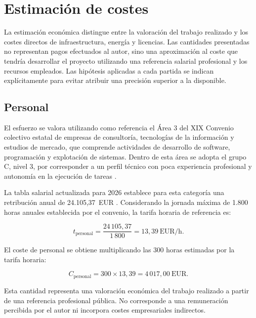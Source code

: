 \section{Estimación de costes}
\label{sec:planificacion-costes}

La estimación económica distingue entre la valoración del trabajo realizado y los costes directos de infraestructura, energía y licencias. Las cantidades presentadas no representan pagos efectuados al autor, sino una aproximación al coste que tendría desarrollar el proyecto utilizando una referencia salarial profesional y los recursos empleados. Las hipótesis aplicadas a cada partida se indican explícitamente para evitar atribuir una precisión superior a la disponible.

\subsection{Personal}

El esfuerzo se valora utilizando como referencia el Área 3 del XIX Convenio colectivo estatal de empresas de consultoría, tecnologías de la información y estudios de mercado, que comprende actividades de desarrollo de software, programación y explotación de sistemas. Dentro de esta área se adopta el grupo C, nivel 3, por corresponder a un perfil técnico con poca experiencia profesional y autonomía en la ejecución de tareas \parencite{convenioConsultoria2025}.

La tabla salarial actualizada para 2026 establece para esta categoría una retribución anual de 24.105,37~EUR \parencite{tablasConsultoria2026}. Considerando la jornada máxima de 1.800 horas anuales establecida por el convenio, la tarifa horaria de referencia es:

\begin{equation}
    t_{\mathrm{personal}}=
    \frac{24\,105{,}37}{1\,800}
    =13{,}39~\mathrm{EUR/h}.
    \label{eq:tarifa-personal}
\end{equation}

El coste de personal se obtiene multiplicando las 300 horas estimadas por la tarifa horaria:

\begin{equation}
    C_{\mathrm{personal}}=
    300\times13{,}39
    =4\,017{,}00~\mathrm{EUR}.
    \label{eq:coste-personal}
\end{equation}

Esta cantidad representa una valoración económica del trabajo realizado a partir de una referencia profesional pública. No corresponde a una remuneración percibida por el autor ni incorpora costes empresariales indirectos.

